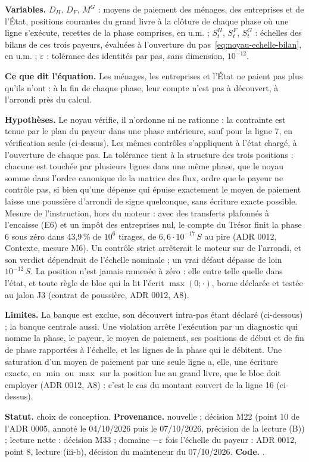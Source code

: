 \documentclass[11pt,a4paper]{article}
\newcommand{\variables}{\par\noindent\textbf{Variables.} }
\newcommand{\sens}{\par\noindent\textbf{Ce que dit l'équation.} }
\newcommand{\hyp}{\par\noindent\textbf{Hypothèses.} }
\newcommand{\limites}{\par\noindent\textbf{Limites.} }
\newcommand{\code}[1]{\texttt{\detokenize{#1}}}
\newcommand{\tracabilite}[3]{\par\smallskip\noindent\textbf{Statut.} #1. \textbf{Provenance.} #2. \textbf{Code.} \code{#3}.}
\begin{document}
\begin{lecture}
\variables $D_H$, $D_F$, $M^G$ : moyens de paiement des ménages, des entreprises et de l'État, positions courantes du grand livre à la clôture de chaque phase où une ligne s'exécute, recettes de la phase comprises, en u.m. ; $S^H_t$, $S^F_t$, $S^G_t$ : échelles des bilans de ces trois payeurs, évaluées à l'ouverture du pas~\eqref{eq:noyau-echelle-bilan}, en u.m. ; $\varepsilon$ : tolérance des identités par pas, sans dimension, $10^{-12}$.
\sens Les ménages, les entreprises et l'État ne paient pas plus qu'ils n'ont : à la fin de chaque phase, leur compte n'est pas à découvert, à l'arrondi près du calcul.
\hyp Le noyau vérifie, il n'ordonne ni ne rationne : la contrainte est tenue par le plan du payeur dans une phase antérieure, sauf pour la ligne 7, en vérification seule (ci-dessus). Les mêmes contrôles s'appliquent à l'état chargé, à l'ouverture de chaque pas. La tolérance tient à la structure des trois positions : chacune est touchée par plusieurs lignes dans une même phase, que le noyau somme dans l'ordre canonique de la matrice des flux, ordre que le payeur ne contrôle pas, si bien qu'une dépense qui épuise exactement le moyen de paiement laisse une poussière d'arrondi de signe quelconque, sans écriture exacte possible. Mesure de l'instruction, hors du moteur : avec des transferts plafonnés à l'encaisse (E6) et un impôt des entreprises nul, le compte du Trésor finit la phase 6 sous zéro dans 43,9\,\% de $10^6$ tirages, de $6{,}6 \cdot 10^{-17}\,S$ au pire (ADR 0012, Contexte, mesure M6). Un contrôle strict arrêterait le moteur sur de l'arrondi, et son verdict dépendrait de l'échelle nominale ; un vrai défaut dépasse de loin $10^{-12}\,S$. La position n'est jamais ramenée à zéro : elle entre telle quelle dans l'état, et toute règle de bloc qui la lit l'écrit $\max(0 ; \cdot)$, borne déclarée et testée au jalon J3 (contrat de poussière, ADR 0012, A8).
\limites La banque est exclue, son découvert intra-pas étant déclaré (ci-dessous) ; la banque centrale aussi. Une violation arrête l'exécution par un diagnostic qui nomme la phase, le payeur, le moyen de paiement, ses positions de début et de fin de phase rapportées à l'échelle, et les lignes de la phase qui le débitent. Une saturation d'un moyen de paiement par une seule ligne a, elle, une écriture exacte, en $\min$ ou $\max$ sur la position lue au grand livre, que le bloc doit employer (ADR 0012, A8) : c'est le cas du montant couvert de la ligne 16 (ci-dessus).
\tracabilite{choix de conception}{nouvelle ; décision M22 (point 10 de l'ADR 0005, annoté le 04/10/2026 puis le 07/10/2026, précision de la lecture (B)) ; lecture nette : décision M33 ; domaine $-\varepsilon$ fois l'échelle du payeur : ADR 0012, point 8, lecture (iii-b), décision du mainteneur du 07/10/2026}{nations.noyau.identites.verifier_caisse}
\end{lecture}
\end{document}
